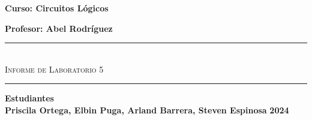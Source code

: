 \begin{titlepage}
\begin{center}
      {\Large \textbf{Curso: Circuitos Lógicos}}\medskip
      
      {\Large \textbf{Profesor: Abel Rodríguez}}

      \rule{\linewidth}{0.75mm}\\
          {\Large \textsc{Informe de Laboratorio 5}} 
      \rule{\linewidth}{0.75mm}\medskip

      {\Large \textbf{Estudiantes}}\\
      \vspace{5mm}
      {\Large \textbf{Priscila Ortega, Elbin Puga, Arland Barrera, Steven Espinosa}}
      \vfill
      {\Huge \textbf{2024}}
  \end{center}
\end{titlepage}